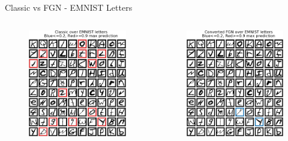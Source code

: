 \documentclass{beamer}
\begin{document}
\begin{frame}{Classic vs FGN - EMNIST Letters}
    \vspace{-2mm}
    \begin{columns}
    \begin{column}{.33\textwidth}
    \begin{figure}
        \includegraphics[width=.85\textwidth]{images/Letters/classic-letters.png}
    \end{figure}
    \end{column}
    \begin{column}{.33\textwidth}
    \begin{figure}
        \includegraphics[width=.85\textwidth]{images/Letters/converted-letters.png}

\end{figure}
\end{column}
\end{columns}
\end{frame}
\end{document}
